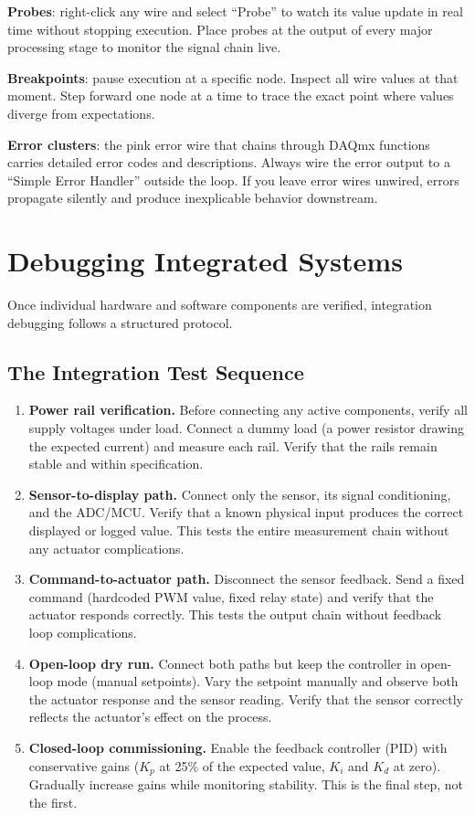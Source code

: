 \documentclass[11pt,letterpaper,twoside,openany]{book}
\begin{document}
\textbf{Probes}: right-click any wire and select ``Probe'' to watch its value update in real time without stopping execution. Place probes at the output of every major processing stage to monitor the signal chain live.

\textbf{Breakpoints}: pause execution at a specific node. Inspect all wire values at that moment. Step forward one node at a time to trace the exact point where values diverge from expectations.

\textbf{Error clusters}: the pink error wire that chains through DAQmx functions carries detailed error codes and descriptions. Always wire the error output to a ``Simple Error Handler'' outside the loop. If you leave error wires unwired, errors propagate silently and produce inexplicable behavior downstream.

\section{Debugging Integrated Systems}

Once individual hardware and software components are verified, integration debugging follows a structured protocol.

\subsection{The Integration Test Sequence}
\begin{enumerate}[leftmargin=1.5em]
\item \textbf{Power rail verification.} Before connecting any active components, verify all supply voltages under load. Connect a dummy load (a power resistor drawing the expected current) and measure each rail. Verify that the rails remain stable and within specification.

\item \textbf{Sensor-to-display path.} Connect only the sensor, its signal conditioning, and the ADC/MCU. Verify that a known physical input produces the correct displayed or logged value. This tests the entire measurement chain without any actuator complications.

\item \textbf{Command-to-actuator path.} Disconnect the sensor feedback. Send a fixed command (hardcoded PWM value, fixed relay state) and verify that the actuator responds correctly. This tests the output chain without feedback loop complications.

\item \textbf{Open-loop dry run.} Connect both paths but keep the controller in open-loop mode (manual setpoints). Vary the setpoint manually and observe both the actuator response and the sensor reading. Verify that the sensor correctly reflects the actuator's effect on the process.

\item \textbf{Closed-loop commissioning.} Enable the feedback controller (PID) with conservative gains ($K_p$ at 25\% of the expected value, $K_i$ and $K_d$ at zero). Gradually increase gains while monitoring stability. This is the final step, not the first.
\end{enumerate}
\end{document}
